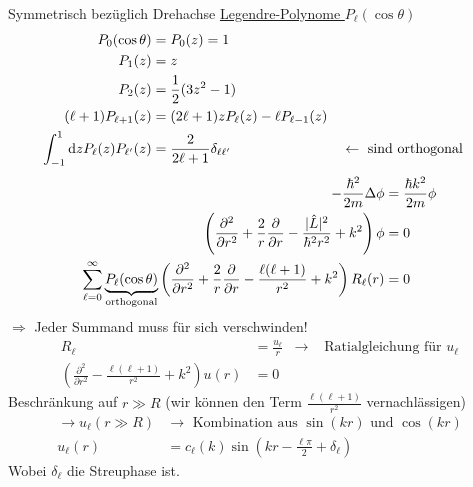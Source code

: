 Symmetrisch bezüglich Drehachse
\FloatBarrier
	\underline{Legendre-Polynome $P_\ell (\cos \theta)$}
		\begin{align*}
			P_0 (\cos \theta) &= P_0 (z) = 1\\
			P_1 (z) &= z \\
			P_2 (z) &= \frac{1}{2} (3z^2-1) \\
			(\ell + 1) P_{\ell + 1} (z) &= (2 \ell + 1) z P_\ell (z) - \ell P_{\ell - 1} (z) \\
			\int_{-1}^{1} \mathrm{d} z P_\ell (z) P_{\ell'} (z) &= 
			\frac{2}{2\ell + 1} \delta_{\ell \ell'} &
			&\leftarrow \text{ sind orthogonal}
		\end{align*}
		\begin{align*}
			-\frac{\hbar^2}{2m} \Delta \phi &= \frac{\hbar k^2}{2m} \phi \\
			\left( \frac{\partial^2}{\partial r^2} + \frac{2}{r} \frac{\partial}{\partial r} 
			- \frac{|\hat{L}|^2}{\hbar^2 r^2} + k^2
			\right) \phi &= 0 \\
			\sum_{\ell = 0}^{\infty} \underbrace{P_\ell (\cos \theta)}_{\mathclap{\text{orthogonal}}}
			\left( \frac{\partial^2}{\partial r^2} + \frac{2}{r} \frac{\partial}{\partial r} 
			- \frac{\ell(\ell+1)}{r^2} + k^2
			\right) R_\ell (r) &= 0
		\end{align*}
	$\Rightarrow$ Jeder Summand muss für sich verschwinden!
		\begin{align*}
			R_\ell &= \frac{u_\ell}{r} &\rightarrow &\text{ Ratialgleichung für } u_\ell \\
			\left( \frac{\partial^2}{\partial r^2} - \frac{\ell(\ell+1)}{r^2} + k^2
			\right) u(r) &= 0
		\end{align*}
	Beschränkung auf $r\gg R$ (wir können den Term $\frac{\ell(\ell+1)}{r^2}$ vernachlässigen)
		\begin{align*}
			\rightarrow u_\ell(r \gg R) &\rightarrow \text{ Kombination aus } \sin (kr) \text{ und } \cos(kr) \\
			u_\ell(r) &= c_\ell (k) \sin \left( kr - \frac{\ell \pi}{2} + \delta_\ell \right)
		\end{align*}
	Wobei $\delta_\ell$ die Streuphase ist. 
	

